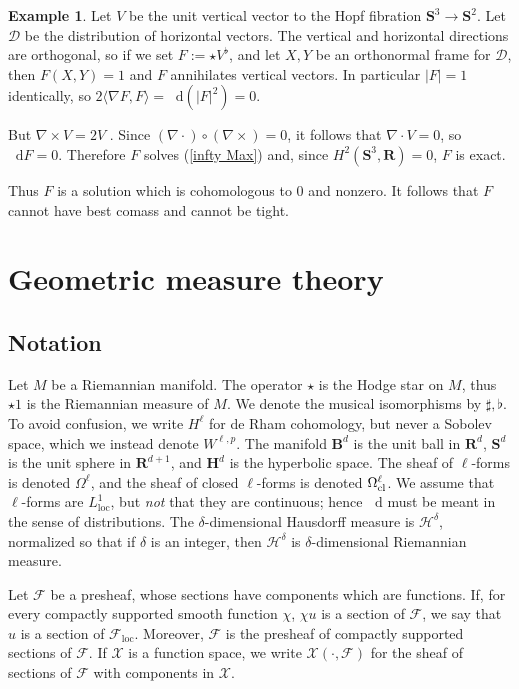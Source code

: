 \documentclass[reqno,11pt]{amsart}
\newcommand{\RR}{\mathbf{R}}
\newcommand{\Hyp}{\mathbf H}
\newcommand{\Sph}{\mathbf S}
\newcommand{\Ball}{\mathbf{B}}
\newcommand*\dif{\mathop{}\!\mathrm{d}}
\newcommand{\loc}{\mathrm{loc}}
\theoremstyle{definition}
\newtheorem{example}[theorem]{Example}
\numberwithin{equation}{section}
\begin{document}
\begin{example}\label{integrability needed}
Let $V$ be the unit vertical vector to the Hopf fibration $\Sph^3 \to \Sph^2$.
Let $\mathscr D$ be the distribution of horizontal vectors.
The vertical and horizontal directions are orthogonal, so if we set $F := \star V^\flat$, and let $X, Y$ be an orthonormal frame for $\mathscr D$, then $F(X, Y) = 1$ and $F$ annihilates vertical vectors.
In particular $|F| = 1$ identically, so $2\langle \nabla F, F\rangle = \dif(|F|^2) = 0$.

But $\nabla \times V = 2V$ \cite[\S3]{Peralta_Salas_2023}.
Since $(\nabla \cdot) \circ (\nabla \times) = 0$, it follows that $\nabla \cdot V = 0$, so $\dif F = 0$.
Therefore $F$ solves (\ref{infty Max}) and, since $H^2(\Sph^3, \RR) = 0$, $F$ is exact.

Thus $F$ is a solution which is cohomologous to $0$ and nonzero.
It follows that $F$ cannot have best comass and cannot be tight.
\end{example}

\appendix
\section{Geometric measure theory}\label{GMT appendix}
\subsection{Notation}
Let $M$ be a Riemannian manifold.
The operator $\star$ is the Hodge star on $M$, thus $\star 1$ is the Riemannian measure of $M$.
We denote the musical isomorphisms by $\sharp, \flat$.
To avoid confusion, we write $H^\ell$ for de Rham cohomology, but never a Sobolev space, which we instead denote $W^{\ell, p}$.
The manifold $\Ball^d$ is the unit ball in $\RR^d$, $\Sph^d$ is the unit sphere in $\RR^{d + 1}$, and $\Hyp^d$ is the hyperbolic space.
The sheaf of $\ell$-forms is denoted $\Omega^\ell$, and the sheaf of closed $\ell$-forms is denoted $\Omega^\ell_{\rm cl}$.
We assume that $\ell$-forms are $L^1_\loc$, but \emph{not} that they are continuous; hence $\dif$ must be meant in the sense of distributions.
The $\delta$-dimensional Hausdorff measure is $\mathcal H^\delta$, normalized so that if $\delta$ is an integer, then $\mathcal H^\delta$ is $\delta$-dimensional Riemannian measure.

Let $\mathscr F$ be a presheaf, whose sections have components which are functions.
If, for every compactly supported smooth function $\chi$, $\chi u$ is a section of $\mathscr F$, we say that $u$ is a section of $\mathscr F_\loc$.
Moreover, $\mathscr F$ is the presheaf of compactly supported sections of $\mathscr F$.
If $\mathcal X$ is a function space, we write $\mathcal X(\cdot, \mathscr F)$ for the sheaf of sections of $\mathscr F$ with components in $\mathcal X$.
\end{document}

